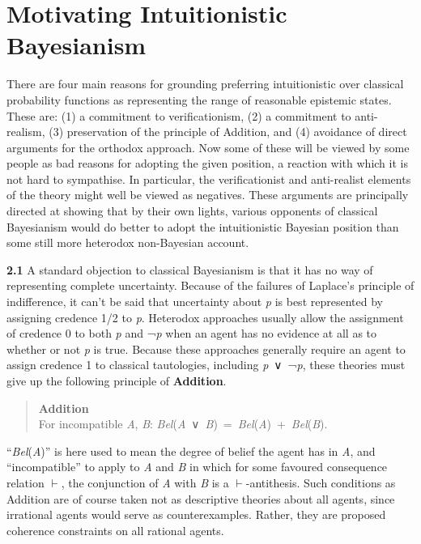 \documentclass[
  11pt,
  letterpaper,
  DIV=11,
  numbers=noendperiod,
  twoside]{scrartcl}
\begin{document}
\section{Motivating Intuitionistic
Bayesianism}\label{motivating-intuitionistic-bayesianism}

There are four main reasons for grounding preferring intuitionistic over
classical probability functions as representing the range of reasonable
epistemic states. These are: (1) a commitment to verificationism, (2) a
commitment to anti-realism, (3) preservation of the principle of
Addition, and (4) avoidance of direct arguments for the orthodox
approach. Now some of these will be viewed by some people as bad reasons
for adopting the given position, a reaction with which it is not hard to
sympathise. In particular, the verificationist and anti-realist elements
of the theory might well be viewed as negatives. These arguments are
principally directed at showing that by their own lights, various
opponents of classical Bayesianism would do better to adopt the
intuitionistic Bayesian position than some still more heterodox
non-Bayesian account.

\textbf{2.1} A standard objection to classical Bayesianism is that it
has no way of representing complete uncertainty. Because of the failures
of Laplace's principle of indifference, it can't be said that
uncertainty about \emph{p} is best represented by assigning credence 1/2
to \emph{p}. Heterodox approaches usually allow the assignment of
credence 0 to both \emph{p} and ¬\emph{p} when an agent has no evidence
at all as to whether or not \emph{p} is true. Because these approaches
generally require an agent to assign credence 1 to classical
tautologies, including \emph{p}~∨~¬\emph{p}, these theories must give up
the following principle of \textbf{Addition}.

\begin{quote}
\textbf{Addition}\\
For incompatible \emph{A}, \emph{B}:
\emph{Bel}(\emph{A}~∨~\emph{B})~=~\emph{Bel}(\emph{A})~+~\emph{Bel}(\emph{B}).
\end{quote}

``\emph{Bel}(\emph{A})'' is here used to mean the degree of belief the
agent has in \emph{A}, and ``incompatible'' to apply to \emph{A} and
\emph{B} in which for some favoured consequence relation \(\vdash\), the
conjunction of \emph{A} with \emph{B} is a \(\vdash\)-antithesis. Such
conditions as Addition are of course taken not as descriptive theories
about all agents, since irrational agents would serve as
counterexamples. Rather, they are proposed coherence constraints on all
rational agents.
\end{document}
